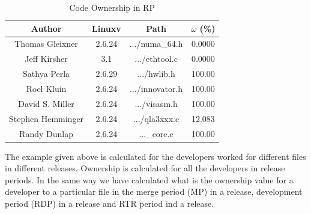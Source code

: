 \documentclass{acm_proc_article-sp}
\begin{document}
\begin{table}[ht]
\caption{Code Ownership in RP}  %
\centering 						%
\begin{tabular}{c c c c}				%
\hline\hline						%
Author 				& Linuxv		& Path				& $\omega$ (\%) \\ [0.5ex]
\hline 							%
Thomas Gleixner		& 2.6.24		& .../numa\_64.h	& 0.0000\\
Jeff Kirsher			& 3.1		& .../ethtool.c		& 0.0000\\
Sathya Perla			& 2.6.29		& .../hwlib.h		& 100.00\\
Roel Kluin			& 2.6.24		& .../innovator.h 	& 100.00\\
David S. Miller		& 2.6.24		& .../visasm.h 		& 100.00\\
Stephen Hemminger	& 2.6.24		& .../qla3xxx.c	 	& 12.083\\
Randy Dunlap			& 2.6.24		& ...\_core.c 		& 100.00\\
[1ex]							%
\hline 							%
\end{tabular}
\label{table:nonlin} 				%
\end{table}
The example given above is calculated for the developers worked for different files in different releases. Ownership is calculated for all the developers in release periods. In the same way we have calculated what is the ownership value for a developer to a particular file in the merge period (MP) in a release, development period (RDP) in a release and RTR period ind a release.
\end{document}
